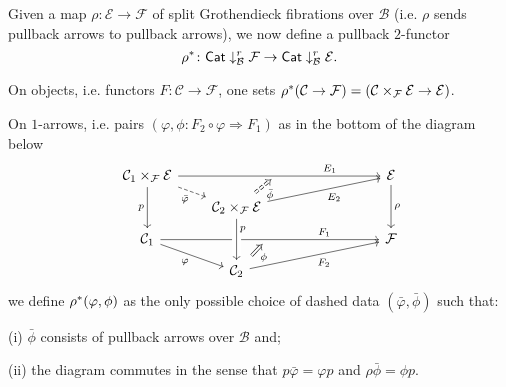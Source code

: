 \documentclass[a4paper,10pt
,draft
]{article}%
\numberwithin{equation}{section}
\numberwithin{figure}{section}
\theoremstyle{definition} %
\newcommand{\1}{\ensuremath{\mathbbm 1}}%
\begin{document}
Given a map $\rho \colon \mathcal{E} \to \mathcal{F}$
of split Grothendieck fibrations over $\mathcal{B}$
(i.e. $\rho$ sends pullback arrows to pullback arrows),
we now define a pullback $2$-functor 
\begin{equation}\label{WSPANPULL EQ}
\rho^{\**} \colon
\mathsf{Cat} \downarrow^r_\mathcal{B} \mathcal{F} 
\to
\mathsf{Cat} \downarrow^r_\mathcal{B} \mathcal{E}.
\end{equation}

On objects, i.e. functors $F \colon \mathcal{C} \to \mathcal{F}$, one sets 
$\rho^{\**}(\mathcal{C} \to \mathcal{F})=
(\mathcal{C} \times_{\mathcal{F}} \mathcal{E}
\to \mathcal{E})
$.

On $1$-arrows, i.e. pairs 
$(\varphi,\phi \colon F_2 \circ \varphi \Rightarrow F_1)$
as in the bottom of the diagram below
\[
\begin{tikzcd}[column sep = 20pt, row sep = 7pt]
\mathcal{C}_1 \times_{\mathcal{F}} \mathcal{E} 
\ar{rrrrr}[name=toE]{}[near end]{E_1} \ar[dashed]{rd}[swap]{\bar{\varphi}} \ar{dd}[swap]{p}
&&&
&&
\mathcal{E}  \ar{dd}{\rho}
\\
&
|[alias=DBE]|
\mathcal{C}_2 \times_{\mathcal{F}} \mathcal{E} \ar{rrrru}[swap]{E_2}
\\
\mathcal{C}_1 \ar{rrrrr}[name=toB]{}[near end]{F_1} \ar{rd}[swap]{\varphi}
&&&
&&
\mathcal{F} 
\\
&
|[alias=D]| \mathcal{C}_2 \ar{rrrru}[swap]{F_2}
\arrow[Rightarrow, from=DBE, to=toE, shorten <=0.15cm,shorten >=0.15cm,dashed
,swap,"\bar{\phi}"
]
\arrow[Rightarrow, from=D, to=toB, shorten <=0.15cm,shorten >=0.15cm,swap,"\phi"]
\arrow[from=DBE, to=D, crossing over, near start, "p"]
\end{tikzcd}
\]
we define $\rho^{\**}(\varphi,\phi)$ as the only possible choice of dashed data
$(\bar{\varphi},\bar{\phi})$ such that:
\begin{enumerate*}
\item[(i)] $\bar{\phi}$ consists of pullback arrows over $\mathcal{B}$
and;
\item[(ii)] the diagram commutes in the sense that
$p \bar{\varphi} = \varphi p$ and 
$\rho \bar{\phi} = \phi p$.
\end{enumerate*}
\end{document}
